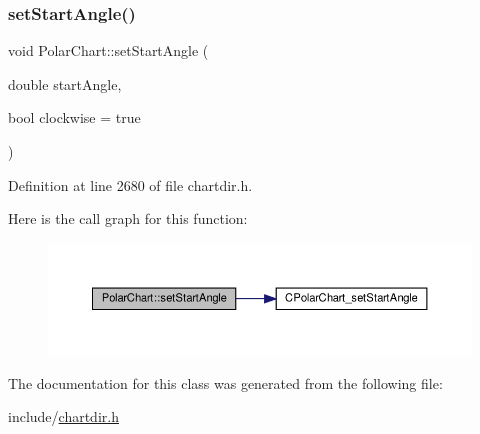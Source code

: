 \subsubsection{\texorpdfstring{set\+Start\+Angle()}{setStartAngle()}}
{\footnotesize\ttfamily void Polar\+Chart\+::set\+Start\+Angle (\begin{DoxyParamCaption}\item[{double}]{start\+Angle,  }\item[{bool}]{clockwise = {\ttfamily true} }\end{DoxyParamCaption})\hspace{0.3cm}{\ttfamily [inline]}}



Definition at line 2680 of file chartdir.\+h.

Here is the call graph for this function\+:
\nopagebreak
\begin{figure}[H]
\begin{center}
\leavevmode
\includegraphics[width=350pt]{class_polar_chart_a46183032bdf951a3b7b940c38aceb30a_cgraph}
\end{center}
\end{figure}


The documentation for this class was generated from the following file\+:\begin{DoxyCompactItemize}
\item 
include/\hyperlink{chartdir_8h}{chartdir.\+h}\end{DoxyCompactItemize}
